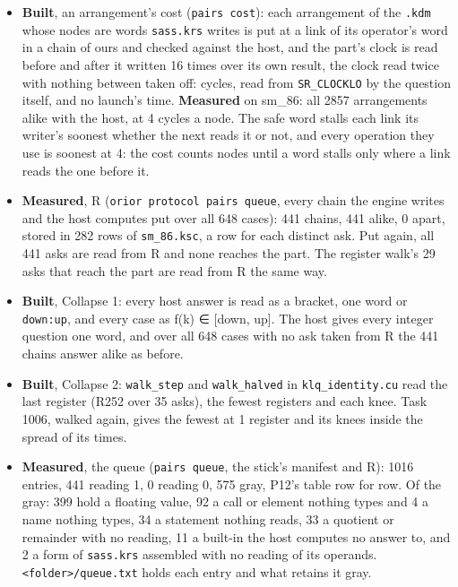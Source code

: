 \begin{itemize}
\item \textbf{Built}, an arrangement's cost (\texttt{pairs cost}): each arrangement of the \texttt{.\allowbreak{}kdm} whose nodes are words \texttt{sass.\allowbreak{}krs} writes is put at a link of its operator's word in a chain of ours and checked against the host, and the part's clock is read before and after it written 16 times over its own result, the clock read twice with nothing between taken off: cycles, read from \texttt{SR\_\allowbreak{}CLOCKLO} by the question itself, and no launch's time. \textbf{Measured} on sm\_\allowbreak{}86: all 2857 arrangements alike with the host, at 4 cycles a node. The safe word stalls each link its writer's soonest whether the next reads it or not, and every operation they use is soonest at 4: the cost counts nodes until a word stalls only where a link reads the one before it.
\item \textbf{Measured}, R (\texttt{orior protocol pairs queue}, every chain the engine writes and the host computes put over all 648 cases): 441 chains, 441 alike, 0 apart, stored in 282 rows of \texttt{sm\_\allowbreak{}86.\allowbreak{}ksc}, a row for each distinct ask. Put again, all 441 asks are read from R and none reaches the part. The register walk's 29 asks that reach the part are read from R the same way.
\item \textbf{Built}, Collapse 1: every host answer is read as a bracket, one word or \texttt{down:up}, and every case as f(k) ∈ [down, up]. The host gives every integer question one word, and over all 648 cases with no ask taken from R the 441 chains answer alike as before.
\item \textbf{Built}, Collapse 2: \texttt{walk\_\allowbreak{}step} and \texttt{walk\_\allowbreak{}halved} in \texttt{klq\_\allowbreak{}identity.\allowbreak{}cu} read the last register (R252 over 35 asks), the fewest registers and each knee. Task 1006, walked again, gives the fewest at 1 register and its knees inside the spread of its times.
\item \textbf{Measured}, the queue (\texttt{pairs queue}, the stick's manifest and R): 1016 entries, 441 reading 1, 0 reading 0, 575 gray, P12's table row for row. Of the gray: 399 hold a floating value, 92 a call or element nothing types and 4 a name nothing types, 34 a statement nothing reads, 33 a quotient or remainder with no reading, 11 a built-in the host computes no answer to, and 2 a form of \texttt{sass.\allowbreak{}krs} assembled with no reading of its operands. \texttt{<folder>/\allowbreak{}queue.\allowbreak{}txt} holds each entry and what retains it gray.

\end{itemize}
